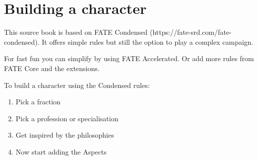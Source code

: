 \chapter{Building a character}

This source book is based on FATE Condensed (https://fate-srd.com/fate-condensed). It offers simple rules but still the option to play a complex campaign.

For fast fun you can simplify by using FATE Accelerated.
Or add more rules from FATE Core and the extensions.

To build a character using the Condensed rules:

\begin{enumerate}
    \item Pick a fraction
    \item Pick a profession or specialisation
    \item Get inspired by the philosophies
    \item Now start adding the Aspects
\end{enumerate}
